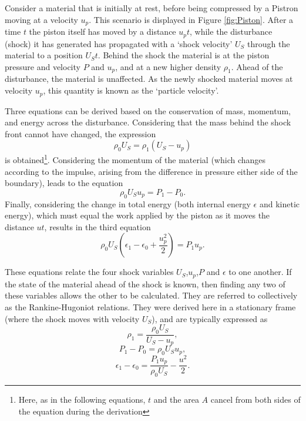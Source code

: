 Consider a material that is initially at rest, before being compressed by a Pistron moving at a velocity $u_p$. This scenario is displayed in Figure \ref{fig:Piston}. After a time $t$ the piston itself has moved by a distance $u_pt$, while the disturbance (shock) it has generated has propagated with a `shock velocity' $U_S$ through the material to a position $U_S t$. Behind the shock the material is at the piston pressure and velocity $P$ and $u_p$, and at a new higher density $\rho_1$. Ahead of the disturbance, the material is unaffected. As the newly shocked material moves at velocity $u_p$, this quantity is known as the `particle velocity'.

Three equations can be derived based on the conservation of mass, momentum, and energy across the disturbance. Considering that the mass behind the shock front cannot have changed, the expression
\begin{equation} \rho_0 U_S = \rho_1 (U_S - u_p) \end{equation}
is obtained\footnote{Here, as in the following equations, $t$ and the area $A$ cancel from both sides of the equation during the derivation}. Considering the momentum of the material (which changes according to the impulse, arising from the difference in pressure either side of the boundary), leads to the equation 
\begin{equation} \rho_0 U_S u_p = P_1 - P_0. \end{equation}
Finally, considering the change in total energy (both internal energy $\epsilon$ and kinetic energy), which must equal the work applied by the piston as it moves the distance $ut$, results in the third equation 
\begin{equation} \rho_0 U_S (\epsilon_1 - \epsilon_0 + \frac{u_p^2}{2}) = P_1 u_p. \end{equation}

These equations relate the four shock variables $U_S$,$u_p$,$P$ and $\epsilon$ to one another. If the state of the material ahead of the shock is known, then finding any two of these variables allows the other to be calculated. They are referred to collectively as the Rankine-Hugoniot relations. They were derived here in a stationary frame (where the shock moves with velocity $U_S$), and are typically expressed as
\begin{equation} \rho_1 = \frac{\rho_0 U_S}{U_S - u_p}, \label{eqn: RH1 stationary} \end{equation}
\begin{equation} P_1 - P_0 = \rho_0 U_S u_p, \label{eqn: RH2 stationary} \end{equation}
\begin{equation} \epsilon_1 - \epsilon_0 = \frac{P_1 u_p}{\rho_0 U_S} - \frac{u^2}{2}. \label{eqn: RH3 stationary} \end{equation}

